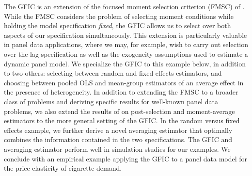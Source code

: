 The GFIC is an extension of the focused moment selection criterion (FMSC) of \cite{DiTraglia2016}.
While the FMSC considers the problem of selecting moment conditions while holding the model specification \emph{fixed}, the GFIC allows us to select over both aspects of our specification simultaneously.
This extension is particularly valuable in panel data applications, where we may, for example, wish to carry out selection over the lag specification as well as the exogeneity assumptions used to estimate a dynamic panel model.
We specialize the GFIC to this example below, in addition to two others: selecting between random and fixed effects estimators, and choosing between pooled OLS and mean-group estimators of an average effect in the presence of heterogeneity.  
In addition to extending the FMSC to a broader class of problems and deriving specific results for well-known panel data problems, we also extend the results of \cite{DiTraglia2016} on post-selection and moment-average estimators to the more general setting of the GFIC.  
In the random versus fixed effects example, we further derive a novel averaging estimator that optimally combines the information contained in the two specifications.
The GFIC and averaging estimator perform well in simulation studies for our examples.
We conclude with an empirical example applying the GFIC to a panel data model for the price elasticity of cigarette demand. 


